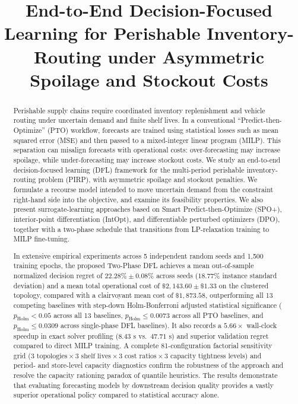 \documentclass[11pt,a4paper]{article}
\title{End-to-End Decision-Focused Learning for Perishable Inventory-Routing under Asymmetric Spoilage and Stockout Costs}
\author{}
\date{}
\theoremstyle{definition}
\theoremstyle{remark}
\begin{document}
\maketitle

\begin{abstract}
Perishable supply chains require coordinated inventory replenishment and vehicle routing under uncertain demand and finite shelf lives. In a conventional ``Predict-then-Optimize'' (PTO) workflow, forecasts are trained using statistical losses such as mean squared error (MSE) and then passed to a mixed-integer linear program (MILP). This separation can misalign forecasts with operational costs: over-forecasting may increase spoilage, while under-forecasting may increase stockout costs. We study an end-to-end decision-focused learning (DFL) framework for the multi-period perishable inventory-routing problem (PIRP), with asymmetric spoilage and stockout penalties. We formulate a recourse model intended to move uncertain demand from the constraint right-hand side into the objective, and examine its feasibility properties. We also present surrogate-learning approaches based on Smart Predict-then-Optimize (SPO+), interior-point differentiation (IntOpt), and differentiable perturbed optimizers (DPO), together with a two-phase schedule that transitions from LP-relaxation training to MILP fine-tuning.

In extensive empirical experiments across 5 independent random seeds and 1,500 training epochs, the proposed Two-Phase DFL achieves a mean out-of-sample normalized decision regret of $22.28\% \pm 0.08\%$ across seeds ($18.77\%$ instance standard deviation) and a mean total operational cost of $\$2,143.60 \pm \$1.33$ on the clustered topology, compared with a clairvoyant mean cost of $\$1,873.58$, outperforming all 13 competing baselines with step-down Holm-Bonferroni adjusted statistical significance ($p_{\text{Holm}} < 0.05$ across all 13 baselines, $p_{\text{Holm}} \le 0.0073$ across all PTO baselines, and $p_{\text{Holm}} \le 0.0309$ across single-phase DFL baselines). It also records a $5.66\times$ wall-clock speedup in exact solver profiling ($8.43\text{ s}$ vs.\ $47.71\text{ s}$) and superior validation regret compared to direct MILP training. A complete 81-configuration factorial sensitivity grid ($3\text{ topologies} \times 3\text{ shelf lives} \times 3\text{ cost ratios} \times 3\text{ capacity tightness levels}$) and period- and store-level capacity diagnostics confirm the robustness of the approach and resolve the capacity rationing paradox of quantile heuristics. The results demonstrate that evaluating forecasting models by downstream decision quality provides a vastly superior operational policy compared to statistical accuracy alone.
\end{abstract}
\end{document}
